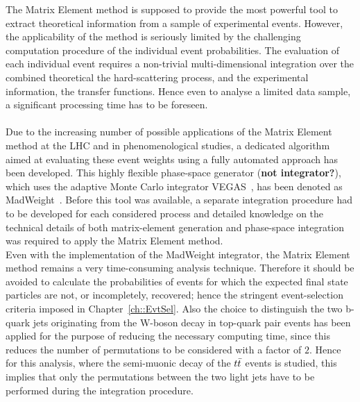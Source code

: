 The Matrix Element method is supposed to provide the most powerful tool to extract theoretical information from a sample of experimental events.
However, the applicability of the method is seriously limited by the challenging computation procedure of the individual event probabilities.
The evaluation of each individual event requires a non-trivial multi-dimensional integration over the combined theoretical the hard-scattering process, and the experimental information, the transfer functions.
Hence even to analyse a limited data sample, a significant processing time has to be foreseen.
\\
\\
Due to the increasing number of possible applications of the Matrix Element method at the LHC and in phenomenological studies, a dedicated algorithm aimed at evaluating these event weights using a fully automated approach has been developed. This highly flexible phase-space generator (\textbf{not integrator?}), which uses the adaptive Monte Carlo integrator VEGAS~\cite{VEGAS}, has been denoted as MadWeight~\cite{MadWeightPaper}.
Before this tool was available, a separate integration procedure had to be developed for each considered process and detailed knowledge on the technical details of both matrix-element generation and phase-space integration was required to apply the Matrix Element method.
\\

Even with the implementation of the MadWeight integrator, the Matrix Element method remains a very time-consuming analysis technique.
Therefore it should be avoided to calculate the probabilities of events for which the expected final state particles are not, or incompletely, recovered; hence the stringent event-selection criteria imposed in Chapter~\ref{ch::EvtSel}.
Also the choice to distinguish the two b-quark jets originating from the W-boson decay in top-quark pair events has been applied for the purpose of reducing the necessary computing time, since this reduces the number of permutations to be considered with a factor of $2$.
Hence for this analysis, where the semi-muonic decay of the $t\bar{t}$ events is studied, this implies that only the permutations between the two light jets have to be performed during the integration procedure. 
\\

